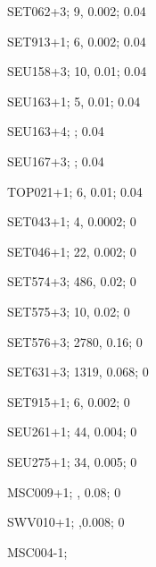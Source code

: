 SET062+3; 9, 0.002; 0.04

SET913+1; 6, 0.002; 0.04

SEU158+3; 10, 0.01; 0.04

SEU163+1; 5, 0.01; 0.04

SEU163+4; ; 0.04

SEU167+3; ; 0.04

TOP021+1; 6, 0.01; 0.04

SET043+1; 4, 0.0002; 0

SET046+1; 22, 0.002; 0

SET574+3; 486, 0.02; 0

SET575+3; 10, 0.02; 0

SET576+3; 2780, 0.16; 0

SET631+3; 1319, 0.068; 0

SET915+1; 6, 0.002; 0

SEU261+1; 44, 0.004; 0

SEU275+1; 34, 0.005; 0

MSC009+1; , 0.08; 0

SWV010+1; ,0.008; 0

MSC004-1;


